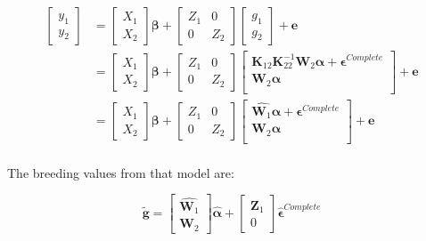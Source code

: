 \documentclass[12pt,titlepage]{article}
\begin{document}
\begin{align} \label{eq:entangled-augmented-single-step-model}
\begin{bmatrix}
  y_1 \\
  y_2 
 \end{bmatrix}
& =
 \begin{bmatrix}
  X_1 \\
  X_2 
 \end{bmatrix}
 \boldsymbol{\beta} + 
 \begin{bmatrix}
  Z_1 & 0 \\
  0 & Z_2 
 \end{bmatrix}
\begin{bmatrix}
  g_1 \\
  g_2 
 \end{bmatrix}
  + \mathbf{e} \\
    & = 
 \begin{bmatrix}
  X_1 \\
  X_2 
 \end{bmatrix}
 \boldsymbol{\beta} + 
 \begin{bmatrix}
  Z_1 & 0 \\
  0 & Z_2 
 \end{bmatrix}
\begin{bmatrix}
  \mathbf{K}_{12}\mathbf{K}_{22}^{-1}\mathbf{W}_2\boldsymbol{\alpha} + \boldsymbol{\epsilon}^{Complete}  \\
  \mathbf{W}_2\boldsymbol{\alpha} \\
 \end{bmatrix}
  + \mathbf{e} \\
    & = 
 \begin{bmatrix}
  X_1 \\
  X_2 
 \end{bmatrix}
 \boldsymbol{\beta} + 
 \begin{bmatrix}
  Z_1 & 0 \\
  0 & Z_2 
 \end{bmatrix}
\begin{bmatrix}
  \hat{\mathbf{W}_1}\boldsymbol{\alpha} + \boldsymbol{\epsilon}^{Complete} \\
  \mathbf{W}_2\boldsymbol{\alpha} \\
 \end{bmatrix}
  + \mathbf{e} \\
\end{align}

The breeding values from that model are:

\begin{equation} \label{eq:breeding-values}
\tilde{\mathbf{g}} = 
 \begin{bmatrix}
  \hat{\mathbf{W}_1} \\
  \mathbf{W}_2 
 \end{bmatrix}
 \hat{\boldsymbol{\alpha}}
 + 
 \begin{bmatrix}
  \mathbf{Z}_1 \\
  0
 \end{bmatrix}
 \hat{\boldsymbol{\epsilon}}^{Complete} 
\end{equation}
\end{document}
